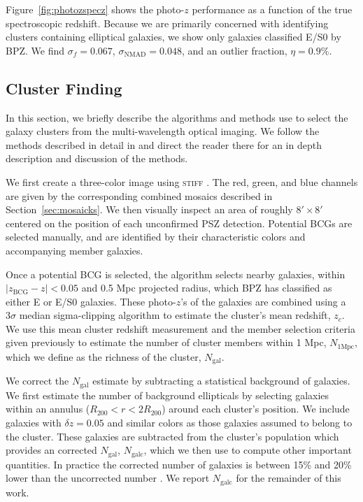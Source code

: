 \documentclass[apj, revtex4-1]{emulateapj}
\begin{document}
Figure~\ref{fig:photozspecz} shows the photo-$z$ performance as a function of the true spectroscopic redshift. Because we are primarily concerned with identifying clusters containing elliptical galaxies, we show only galaxies classified E/S0 by BPZ. We find $\sigma_f = 0.067$, $\sigma_\mathrm{NMAD} = 0.048$, and an outlier fraction, $\eta = 0.9\%$.

\subsection{Cluster Finding}
In this section, we briefly describe the algorithms and methods use to select the galaxy clusters from the multi-wavelength optical imaging. We follow the methods described in detail in \cite{Menanteau2009a, Menanteau2010} and direct the reader there for an in depth description and discussion of the methods.

We first create a three-color image using \textsc{stiff} \citep{Bertin2011}. The red, green, and blue channels are given by the corresponding combined mosaics described in Section~\ref{sec:mosaicks}. We then visually inspect an area of roughly $8' \times 8'$ centered on the position of each unconfirmed PSZ detection. Potential BCGs are selected manually, and are identified by their characteristic colors and accompanying member galaxies.


Once a potential BCG is selected, the algorithm selects nearby galaxies, within $|z_\mathrm{BCG} - z| < 0.05$ and 0.5 Mpc projected radius, which BPZ has classified as either E or E/S0 galaxies. These photo-$z$'s of the galaxies are combined using a $3\sigma$ median sigma-clipping algorithm to estimate the cluster's mean redshift, $z_c$. We use this mean cluster redshift measurement and the member selection criteria given previously to estimate the number of cluster members within 1 Mpc, $N_\mathrm{1 Mpc}$, which we define as the richness  of the cluster, $N_\mathrm{gal}$.

We correct the $N_\mathrm{gal}$ estimate by subtracting a statistical background of galaxies. We first estimate the number of background ellipticals by selecting galaxies within an annulus ($R_{200} <r < 2R_{200}$) around each cluster's position. We include galaxies with $\delta z = 0.05$ and similar colors as those galaxies assumed to belong to the cluster. These galaxies are subtracted from the cluster's population which provides an corrected $N_\mathrm{gal}$, $N_\mathrm{galc}$, which we then use to compute other important quantities. In practice the corrected number of galaxies is between 15\% and 20\% lower than the uncorrected number \citep{Menanteau2010}. We report $N_\mathrm{galc}$ for the remainder of this work.
\end{document}
